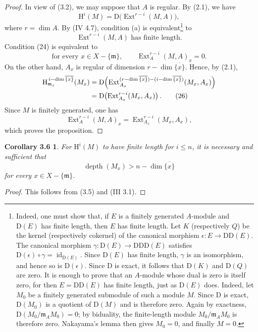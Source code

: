 \documentclass[11pt,a4paper]{article}
\newcommand{\Extop}{\operatorname{Ext}}
\newcommand{\depthop}{\operatorname{depth}}
\newcommand{\HH}{\mathrm H}
\newcommand{\DD}{\mathrm D}
\theoremstyle{sgaprop}
\theoremstyle{sgacor}
\newtheorem*{sgacorollary}{Corollary 3.6}
\renewcommand{\qedsymbol}{\textup{Q.E.D.}}
\begin{document}
\begin{proof}
\renewcommand{\qedsymbol}{}
In view of \textup{(3.2)}, we may suppose that $A$ is regular. By
\textup{(2.1)}, we have
\[
  \HH^i(M)=\DD\bigl(\Extop^{r-i}(M,A)\bigr),
\]
where $r=\dim A$. By \textup{(IV 4.7)}, condition \textup{(a)} is
equivalent\footnote{Indeed, one must show that, if $E$ is a finitely generated
$A$-module and $\DD(E)$ has finite length, then $E$ has finite length. Let $K$
(respectively $Q$) be the kernel (respectively cokernel) of the canonical
morphism $\epsilon\colon E\to\DD\DD(E)$. The canonical morphism
$\gamma\colon\DD(E)\to\DD\DD\DD(E)$ satisfies
$\DD(\epsilon)\circ\gamma=\operatorname{id}_{\DD(E)}$. Since $\DD(E)$ has
finite length, $\gamma$ is an isomorphism, and hence so is
$\DD(\epsilon)$. Since $\DD$ is exact, it follows that $\DD(K)$ and
$\DD(Q)$ are zero. It is enough to prove that an $A$-module whose dual is zero
is itself zero, for then $E=\DD\DD(E)$ has finite length, just as $\DD(E)$
does. Indeed, let $M_0$ be a finitely generated submodule of such a module
$M$. Since $\DD$ is exact, $\DD(M_0)$ is a quotient of $\DD(M)$ and is
therefore zero. Again by exactness,
$\DD(M_0/\mathfrak m_A M_0)=0$; by biduality, the finite-length module
$M_0/\mathfrak m_A M_0$ is therefore zero. Nakayama's lemma then gives
$M_0=0$, and finally $M=0$.} to
\begin{equation}
  \Extop^{r-i}(M,A)\text{ has finite length}. \tag{24}
\end{equation}
Condition \textup{(24)} is equivalent to
\begin{equation}
  \text{for every }x\in X-\{\mathfrak m\},\qquad
  \Extop_A^{r-i}(M,A)_x=0. \tag{25}
\end{equation}
On the other hand, $A_x$ is regular of dimension
$r-\dim\overline{\{x\}}$. Hence, by \textup{(2.1)},
\begin{align}
  \HH_{\mathfrak m_x}^{\,i-\dim\overline{\{x\}}}(M_x)
  &={\DD}\!\left(
    \Extop_{A_x}^{(r-\dim\overline{\{x\}})
      -(i-\dim\overline{\{x\}})}(M_x,A_x)
  \right) \notag\\
  &={\DD}\!\left(\Extop_{A_x}^{r-i}(M_x,A_x)\right). \tag{26}
\end{align}
Since $M$ is finitely generated, one has
\[
  \Extop_A^{r-i}(M,A)_x
  =\Extop_{A_x}^{r-i}(M_x,A_x),
\]
which proves the proposition.
\end{proof}

\begin{sgacorollary}
For $\HH^i(M)$ to have finite length for $i\leq n$, it is necessary and
sufficient that
\[
  \depthop(M_x)>n-\dim\overline{\{x\}}
\]
for every $x\in X-\{\mathfrak m\}$.
\end{sgacorollary}

\begin{proof}
\renewcommand{\qedsymbol}{}
This follows from \textup{(3.5)} and \textup{(III 3.1)}.
\end{proof}
\end{document}

